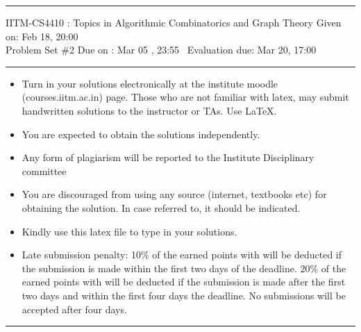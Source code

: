 \documentclass[solution,addpoints,12pt]{exam}
\begin{document}
\hrule
\vspace{3mm}
\noindent 
{\sf IITM-CS4410 : Topics in Algorithmic Combinatorics and Graph Theory  \hfill Given on: Feb 18, 20:00}
\vspace{3mm}\\
\noindent 
{\sf Problem Set \#2 \hfill Due on : Mar 05 , 23:55 }
{\sf ~\hfill Evaluation due: Mar 20, 17:00}
\vspace{3mm}
\hrule
{\small
\begin{itemize}
\item Turn in your solutions electronically at the institute moodle (courses.iitm.ac.in) page. Those who are not familiar with latex, may submit handwritten solutions to the instructor or TAs. 
  Use LaTeX.
\item  You are expected to obtain the solutions independently.    
\item Any form of plagiarism will be reported to the Institute Disciplinary committee
\item  You are discouraged from using any source (internet, textbooks etc) for obtaining the solution. In case referred to, it should be indicated.  
\item Kindly use this latex file to type in your solutions. %
\item  Late submission penalty: 10\% of the earned points with will be deducted if the submission is made within the first two days of the deadline. 20\% of the earned points with will be deducted if the submission is made after the first two days and within the first four days the deadline. No submissions will be accepted after four days.
\end{itemize}}
\hrule
\vspace{3mm}
\end{document}
